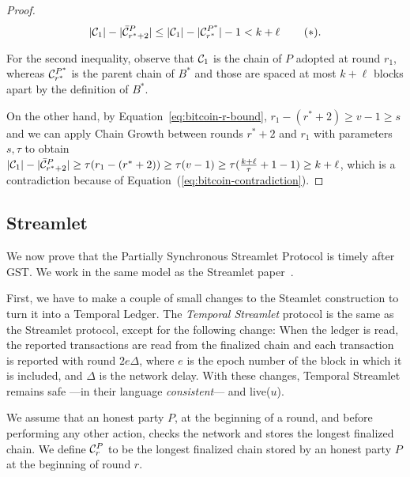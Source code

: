 \begin{proof}

  \[
     |\mathcal{C}_1| - |\bar {\mathcal{C}}^P_{r^* + 2}| \leq
     |\mathcal{C}_1| - |\mathcal{C}^{P^*}_{r^*}| - 1 <
     k + \ell\, \label{eq:bitcoin-contradiction}\tag{$\ast$}.
  \]

  For the second inequality, observe that
  $\mathcal{C}_1$ is the chain of $P$ adopted at round $r_1$,
  whereas $\mathcal{C}^{P^*}_{r^*}$ is
  the parent chain of $B^*$ and those are spaced at most $k + \ell$ blocks
  apart by the definition of $B^*$.

  On the other hand, by Equation~\ref{eq:bitcoin-r-bound}, $r_1 - (r^* + 2) \geq v - 1 \geq s$ and
  we can apply Chain Growth between rounds $r^* + 2$ and $r_1$
  with parameters $s, \tau$ to obtain
  $|\mathcal{C}_1| - |\bar {\mathcal{C}}^P_{r^* + 2}| \geq \tau(r_1 - (r^* + 2)) \geq \tau (v - 1) \geq
  \tau (\frac{k + \ell}{\tau} + 1 - 1) \geq k + \ell$,
  which is a contradiction because of Equation~(\ref{eq:bitcoin-contradiction}).

  \Qed
\end{proof}

\subsection{Streamlet}

We now prove that the Partially Synchronous Streamlet Protocol is timely
after GST.
We work in the same model as the Streamlet paper~\cite{streamlet}.

First, we have to make a couple of small changes to the Steamlet construction to turn it
into a Temporal Ledger.
The \emph{Temporal Streamlet} protocol is the same as the Streamlet protocol, except
for the following change: When the ledger is \textsf{read}, the reported transactions are
read from the finalized chain and each transaction is reported with round $2 e \Delta$,
where $e$ is the epoch number of the block in which it is included, and $\Delta$ is the
network delay.
With these changes, Temporal Streamlet remains safe ---in their language \emph{consistent}--- and live($u$).

We assume that an honest party $P$, at the beginning of a round, and
before performing any other action, checks the network and
stores the longest finalized chain.
We define $\mathcal{C}^P_r$ to be the longest finalized chain stored by an honest
party $P$ at the beginning of round $r$.

